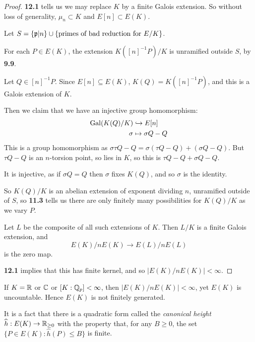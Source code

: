 \documentclass[10pt,a4paper]{article}
\begin{document}
\begin{proof}
  \textbf{12.1} tells us we may replace $K$ by a finite Galois extension. So without loss of generality, $\mu_n \subset K$ and $E[n] \subset E(K)$.

  Let $S = \{\mathfrak{p} |n\} \cup \{\text{primes of bad reduction for }E/K\}$.

  For each $P \in E(K)$, the extension $K([n]^{-1}P)/K$ is unramified outside $S$, by \textbf{9.9}.

  Let $Q \in [n]^{-1}P$. Since $E[n] \subseteq E(K)$, $K(Q) = K([n]^{-1}P)$, and this is a Galois extension of $K$.

  Then we claim that we have an injective group homomorphism:
  \begin{align*}
    \operatorname{Gal}(K(Q)/K) &\hookrightarrow E[n]\\
    \sigma &\mapsto \sigma Q - Q
  \end{align*}
  This is a group homomorphism as $\sigma \tau Q - Q = \sigma(\tau Q - Q) + (\sigma Q - Q)$. But $\tau Q - Q$ is an $n$-torsion point, so lies in $K$, so this is $\tau Q - Q + \sigma Q - Q$.

  It is injective, as if $\sigma Q = Q$ then $\sigma$ fixes $K(Q)$, and so $\sigma$ is the identity.

  So $K(Q) / K$ is an abelian extension of exponent dividing $n$, unramified outside of $S$, so \textbf{11.3} tells us there are only finitely many possibilities for $K(Q)/K$ as we vary $P$.

  Let $L$ be the composite of all such extensions of $K$. Then $L/K$ is a finite Galois extension, and
  \[E(K)/nE(K) \to E(L)/nE(L)\]
  is the zero map.

  \textbf{12.1} implies that this has finite kernel, and so $|E(K)/nE(K)| < \infty$.
\end{proof}
If $K = \mathbb{R}$ or $\mathbb{C}$ or $[K:\mathbb{Q}_p] < \infty$, then $|E(K)/nE(K)|<\infty$, yet $E(K)$ is uncountable. Hence $E(K)$ is not finitely generated.

It is a fact that there is a quadratic form called the \emph{canonical height} $\widehat{h} : E(K) \to \mathbb{R}_{\geq 0}$ with the property that, for any $B \geq 0$, the set $\{P \in E(K) : \hat{h}(P) \leq B\}$ is finite.
\end{document}
